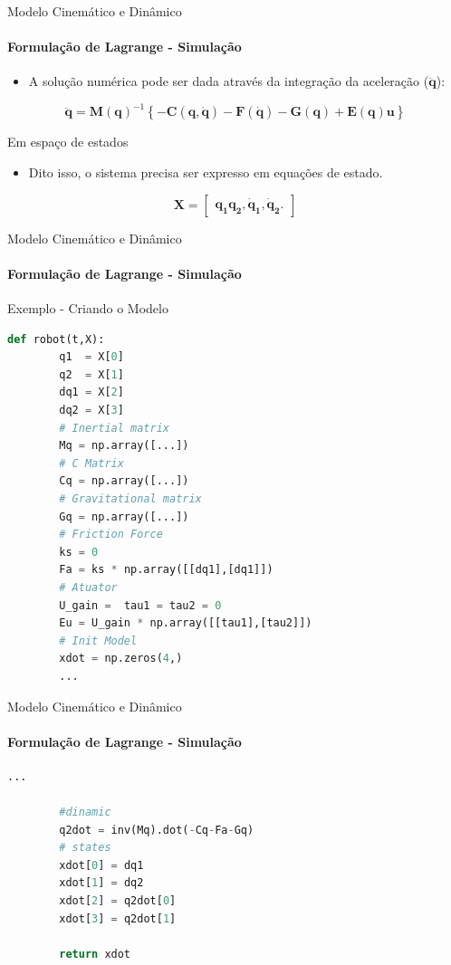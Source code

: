 \documentclass{beamer}
\begin{document}
\begin{frame}{Modelo Cinemático e Dinâmico}
    \framesubtitle{Formulação de Lagrange - Simulação}
    \begin{itemize}
        \item A solução numérica pode ser dada através da integração da aceleração ($\mathbf{\ddot{q}}$):
    \end{itemize}
    \begin{equation}
        \mathbf{\ddot{q}}=\mathbf{M(q)}^{-1}\left\{\mathbf{-C(q, \dot{q})-F(\dot{q})-G(q) + E(q)u}\right\}
    \end{equation}

    \begin{block}{Em espaço de estados}
        \begin{itemize}
            \item Dito isso, o sistema precisa ser expresso em equações de estado.
        \end{itemize}


        \begin{equation*}
            \mathbf{X} = 
            \begin{bmatrix}
                \mathbf{q_1 q_2, \dot{q}_1, \dot{q}_2}.  
            \end{bmatrix}
        \end{equation*}
    \end{block}
\end{frame}


\begin{frame}[fragile]{Modelo Cinemático e Dinâmico}
    \framesubtitle{Formulação de Lagrange - Simulação}
    Exemplo - Criando o Modelo
	\begin{lstlisting}[language=Python]
    def robot(t,X):
        q1  = X[0]
        q2  = X[1]
        dq1 = X[2] 
        dq2 = X[3]
        # Inertial matrix
        Mq = np.array([...]) 
        # C Matrix
        Cq = np.array([...])
        # Gravitational matrix 
        Gq = np.array([...])
        # Friction Force
        ks = 0
        Fa = ks * np.array([[dq1],[dq1]])
        # Atuator
        U_gain =  tau1 = tau2 = 0
        Eu = U_gain * np.array([[tau1],[tau2]])
        # Init Model
        xdot = np.zeros(4,)
        ...
	\end{lstlisting}
\end{frame}



\begin{frame}[fragile]{Modelo Cinemático e Dinâmico}
    \framesubtitle{Formulação de Lagrange - Simulação}

	\begin{lstlisting}[language=Python]
        ...

        #dinamic
        q2dot = inv(Mq).dot(-Cq-Fa-Gq)
        # states
        xdot[0] = dq1
        xdot[1] = dq2
        xdot[2] = q2dot[0]
        xdot[3] = q2dot[1]

        return xdot
	\end{lstlisting}
\end{frame}
\end{document}

